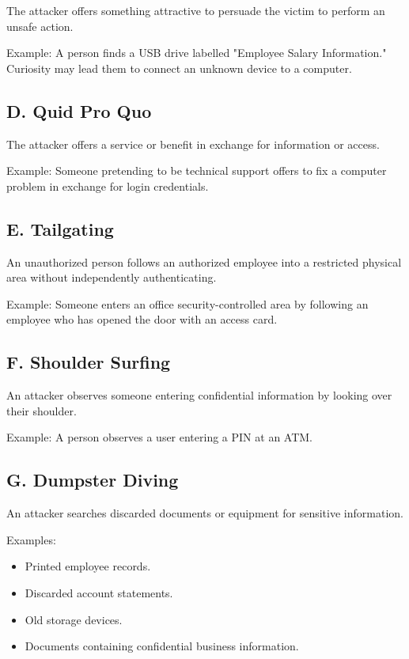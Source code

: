 The attacker offers something attractive to persuade the victim to perform an unsafe action.

Example: A person finds a USB drive labelled "Employee Salary Information." Curiosity may lead them to connect an unknown device to a computer.

\subsection{D. Quid Pro Quo}

The attacker offers a service or benefit in exchange for information or access.

Example: Someone pretending to be technical support offers to fix a computer problem in exchange for login credentials.

\subsection{E. Tailgating}

An unauthorized person follows an authorized employee into a restricted physical area without independently authenticating.

Example: Someone enters an office security-controlled area by following an employee who has opened the door with an access card.

\subsection{F. Shoulder Surfing}

An attacker observes someone entering confidential information by looking over their shoulder.

Example: A person observes a user entering a PIN at an ATM.

\subsection{G. Dumpster Diving}

An attacker searches discarded documents or equipment for sensitive information.

Examples:

\begin{itemize}
\item Printed employee records.
\item Discarded account statements.
\item Old storage devices.
\item Documents containing confidential business information.
\end{itemize}

